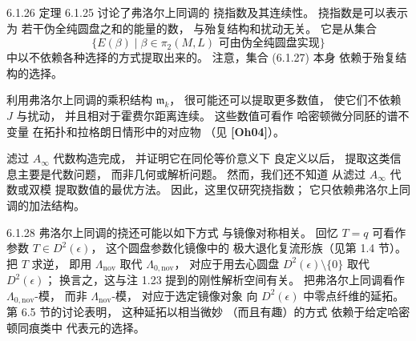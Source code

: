 \begin{remark}{6.1.26}\label{rem:6-1-26}
定理 6.1.25 讨论了弗洛尔上同调的
挠指数及其连续性。
挠指数是可以表示为
若干伪全纯圆盘之和的能量的数，
与殆复结构和扰动无关。
它是从集合
\begin{equation}
\bigl\{E(\beta)\mid
\beta\in\pi_2(M,L)
\text{ 可由伪全纯圆盘实现}\bigr\}
\tag{6.1.27}\label{eq:6-1-27}
\end{equation}
中以不依赖各种选择的方式提取出来的。
注意，集合 (6.1.27) 本身
依赖于殆复结构的选择。

利用弗洛尔上同调的乘积结构
$\mathfrak m_k$，
很可能还可以提取更多数值，
使它们不依赖 $J$ 与扰动，
并且相对于霍费尔距离连续。
这些数值可看作
哈密顿微分同胚的谱不变量
在拓扑和拉格朗日情形中的对应物
（见 \textbf{[Oh04]}）。

滤过 $A_\infty$ 代数构造完成，
并证明它在同伦等价意义下
良定义以后，
提取这类信息主要是代数问题，
而非几何或解析问题。
然而，我们还不知道
从滤过 $A_\infty$ 代数或双模
提取数值的最优方法。
因此，这里仅研究挠指数；
它只依赖弗洛尔上同调的加法结构。
\end{remark}

\begin{remark}{6.1.28}\label{rem:6-1-28}
弗洛尔上同调的挠还可能以如下方式
与镜像对称相关。
回忆 $T=q$ 可看作参数
$T\in D^2(\epsilon)$，
这个圆盘参数化镜像中的
极大退化复流形族（见第 1.4 节）。
把 $T$ 求逆，
即用 $\Lambda_{\mathrm{nov}}$
取代 $\Lambda_{0,\mathrm{nov}}$，
对应于用去心圆盘
$D^2(\epsilon)\setminus\{0\}$
取代 $D^2(\epsilon)$；
换言之，这与注 1.23
提到的刚性解析空间有关。
把弗洛尔上同调看作
$\Lambda_{0,\mathrm{nov}}$-模，
而非 $\Lambda_{\mathrm{nov}}$-模，
对应于选定镜像对象
向 $D^2(\epsilon)$ 中零点纤维的延拓。
第 6.5 节的讨论表明，
这种延拓以相当微妙
（而且有趣）的方式
依赖于给定哈密顿同痕类中
代表元的选择。
\end{remark}
